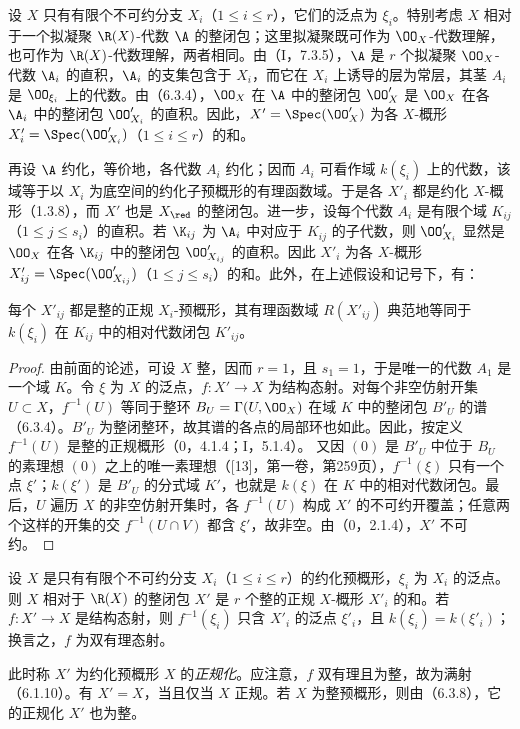 设 $X$ 只有有限个不可约分支 $X_i$（$1\leq i\leq r$），它们的泛点为 $\xi_i$。特别考虑 $X$ 相对于一个拟凝聚 $\R(X)$-代数 $\A$ 的整闭包；这里拟凝聚既可作为 $\OO_X$-代数理解，也可作为 $\R(X)$-代数理解，两者相同。由（I，7.3.5），$\A$ 是 $r$ 个拟凝聚 $\OO_X$-代数 $\A_i$ 的直积，$\A_i$ 的支集包含于 $X_i$，而它在 $X_i$ 上诱导的层为常层，其茎 $A_i$ 是 $\OO_{\xi_i}$ 上的代数。由（6.3.4），$\OO_X$ 在 $\A$ 中的整闭包 $\OO'_X$ 是 $\OO_X$ 在各 $\A_i$ 中的整闭包 $\OO'_{X_i}$ 的直积。因此，$X'=\Spec(\OO'_X)$ 为各 $X$-概形 $X'_i=\Spec(\OO'_{X_i})$（$1\leq i\leq r$）的和。

再设 $\A$ 约化，等价地，各代数 $A_i$ 约化；因而 $A_i$ 可看作域 $k(\xi_i)$ 上的代数，该域等于以 $X_i$ 为底空间的约化子预概形的有理函数域。于是各 $X'_i$ 都是约化 $X$-概形（1.3.8），而 $X'$ 也是 $X_{\red}$ 的整闭包。进一步，设每个代数 $A_i$ 是有限个域 $K_{ij}$（$1\leq j\leq s_i$）的直积。若 $\K_{ij}$ 为 $\A_i$ 中对应于 $K_{ij}$ 的子代数，则 $\OO'_{X_i}$ 显然是 $\OO_X$ 在各 $\K_{ij}$ 中的整闭包 $\OO'_{X_{ij}}$ 的直积。因此 $X'_i$ 为各 $X$-概形 $X'_{ij}=\Spec(\OO'_{X_{ij}})$（$1\leq j\leq s_i$）的和。此外，在上述假设和记号下，有：

每个 $X'_{ij}$ 都是整的正规 $X_i$-预概形，其有理函数域 $R(X'_{ij})$ 典范地等同于 $k(\xi_i)$ 在 $K_{ij}$ 中的相对代数闭包 $K'_{ij}$。
\begin{proof}
由前面的论述，可设 $X$ 整，因而 $r=1$，且 $s_1=1$，于是唯一的代数 $A_1$ 是一个域 $K$。令 $\xi$ 为 $X$ 的泛点，$f:X'\to X$ 为结构态射。对每个非空仿射开集 $U\subset X$，$f^{-1}(U)$ 等同于整环 $B_U=\Gamma(U,\OO_X)$ 在域 $K$ 中的整闭包 $B'_U$ 的谱（6.3.4）。$B'_U$ 为整闭整环，故其谱的各点的局部环也如此。因此，按定义 $f^{-1}(U)$ 是整的正规概形（0，4.1.4；I，5.1.4）。
又因 $(0)$ 是 $B'_U$ 中位于 $B_U$ 的素理想 $(0)$ 之上的唯一素理想（[13]，第一卷，第259页），$f^{-1}(\xi)$ 只有一个点 $\xi'$；$k(\xi')$ 是 $B'_U$ 的分式域 $K'$，也就是 $k(\xi)$ 在 $K$ 中的相对代数闭包。最后，$U$ 遍历 $X$ 的非空仿射开集时，各 $f^{-1}(U)$ 构成 $X'$ 的不可约开覆盖；任意两个这样的开集的交 $f^{-1}(U\cap V)$ 都含 $\xi'$，故非空。由（0，2.1.4），$X'$ 不可约。
\end{proof}

设 $X$ 是只有有限个不可约分支 $X_i$（$1\leq i\leq r$）的约化预概形，$\xi_i$ 为 $X_i$ 的泛点。则 $X$ 相对于 $\R(X)$ 的整闭包 $X'$ 是 $r$ 个整的正规 $X$-概形 $X'_i$ 的和。若 $f:X'\to X$ 是结构态射，则 $f^{-1}(\xi_i)$ 只含 $X'_i$ 的泛点 $\xi'_i$，且 $k(\xi_i)=k(\xi'_i)$；换言之，$f$ 为双有理态射。

此时称 $X'$ 为约化预概形 $X$ 的\emph{正规化}。应注意，$f$ 双有理且为整，故为满射（6.1.10）。有 $X'=X$，当且仅当 $X$ 正规。若 $X$ 为整预概形，则由（6.3.8），它的正规化 $X'$ 也为整。

